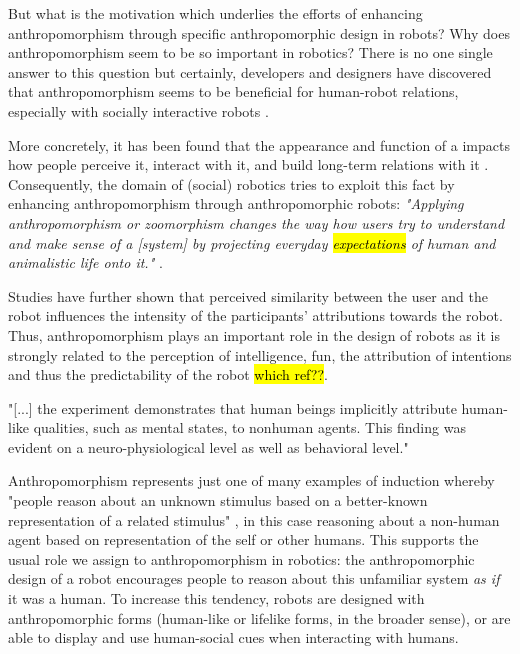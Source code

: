 \documentclass{frontiersSCNS} %
\begin{document}
But what is the motivation which underlies the efforts of enhancing anthropomorphism through specific anthropomorphic design in robots? Why does anthropomorphism seem to be so important in robotics? There is no one single answer to this question but certainly, developers and designers have discovered that anthropomorphism seems to be beneficial for human-robot relations, especially with socially interactive robots \cite{fong_survey_2003}.

More concretely, it has been found that the appearance and function of a impacts how people perceive it, interact with it, and build long-term relations with it \cite{bartneck_shaping_2004}. Consequently, the domain of (social) robotics tries to exploit this fact by enhancing anthropomorphism through anthropomorphic robots: \textit{"Applying anthropomorphism or zoomorphism changes the way how users try to understand and make sense of a [system] by projecting everyday \hl{expectations} of human and animalistic life onto it."} \cite{schmitz_concepts_2011}. 

Studies have further shown that perceived similarity between the user and the robot influences the intensity of the participants' attributions towards the robot. Thus, anthropomorphism plays an important role in the design of robots as it is strongly related to the perception of intelligence, fun, the attribution of intentions and thus the predictability of the robot \hl{which ref??}.


"[...] the experiment demonstrates that human beings implicitly attribute human-like qualities, such as mental states, to nonhuman agents. This finding was evident on a neuro-physiological level as well as behavioral level." \cite{hegel_understanding_2008}


Anthropomorphism represents just one of many examples of induction whereby "people reason about an unknown stimulus based on a better-known representation of a related stimulus" \cite{epley_when_2008}, in this case reasoning about a non-human agent based on representation of the self or other humans. This supports the usual role we assign to anthropomorphism in robotics: the anthropomorphic design of a robot encourages people to reason about this unfamiliar system \emph{as if} it was a human. To increase this tendency, robots are designed with anthropomorphic forms (human-like or lifelike forms, in the broader sense), or are able to display and use human-social cues when interacting with humans.\\
\end{document}
